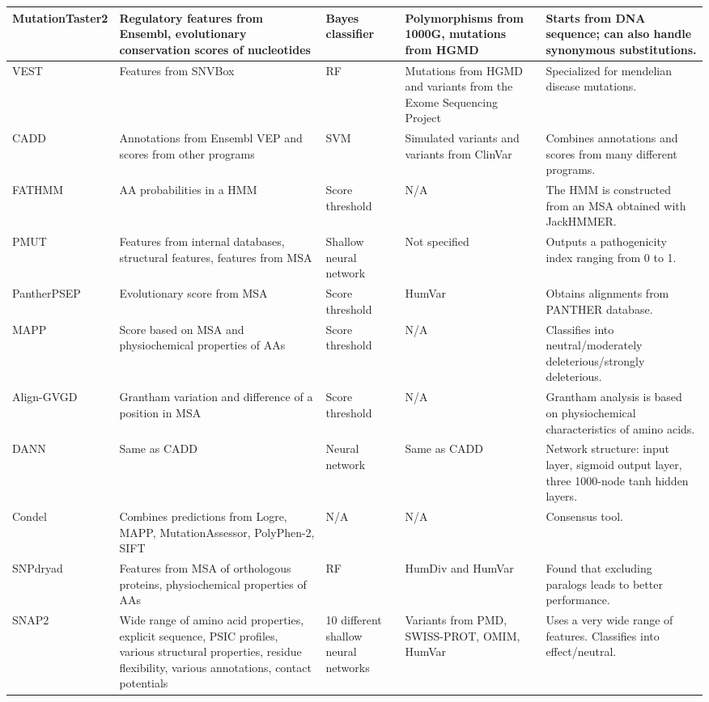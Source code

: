 \begin{center}
\begin{small}
\begin{longtable}{| l | L{4cm} | L{2cm} | L{3cm} | L{5cm} |}
MutationTaster2 & Regulatory features from Ensembl, evolutionary conservation scores of nucleotides & Bayes classifier  & Polymorphisms from 1000G, mutations from HGMD & Starts from DNA sequence; can also handle synonymous substitutions. \\ \hline
VEST & Features from SNVBox & RF & Mutations from HGMD and variants from the Exome Sequencing Project & Specialized for mendelian disease mutations. \\ \hline
CADD & Annotations from Ensembl VEP and scores from other programs & SVM & Simulated variants and variants from ClinVar & Combines annotations and scores from many different programs. \\ \hline
FATHMM & AA probabilities in a HMM & Score threshold & N/A & The HMM is constructed from an MSA obtained with JackHMMER. \\ \hline
PMUT & Features from internal databases, structural features, features from MSA & Shallow neural network & Not specified & Outputs a pathogenicity index ranging from 0 to 1. \\ \hline
PantherPSEP & Evolutionary score from MSA & Score threshold & HumVar & Obtains alignments from PANTHER database. \\ \hline
MAPP & Score based on MSA and physiochemical properties of AAs & Score threshold & N/A & Classifies into neutral/moderately deleterious/strongly deleterious. \\ \hline
Align-GVGD & Grantham variation and difference of a position in MSA & Score threshold & N/A & Grantham analysis is based on physiochemical characteristics of amino acids. \\ \hline
DANN & Same as CADD & Neural network & Same as CADD & Network structure:
input layer, sigmoid output layer, three 1000-node tanh hidden layers. \\ \hline
Condel & Combines predictions from Logre, MAPP, MutationAssessor, PolyPhen-2, SIFT & N/A & N/A & Consensus tool. \\ \hline
SNPdryad & Features from MSA of orthologous proteins, physiochemical properties of AAs & RF & HumDiv and HumVar & Found that excluding paralogs leads to better performance. \\ \hline
SNAP2 & Wide range of amino acid properties, explicit sequence, PSIC profiles, various structural properties, residue flexibility, various annotations, contact potentials & 10 different shallow neural networks  & Variants from PMD, SWISS-PROT, OMIM, HumVar & Uses a very wide range of features. Classifies into effect/neutral. \\ \hline
\end{longtable}
\end{small}
\end{center}
\clearpage


